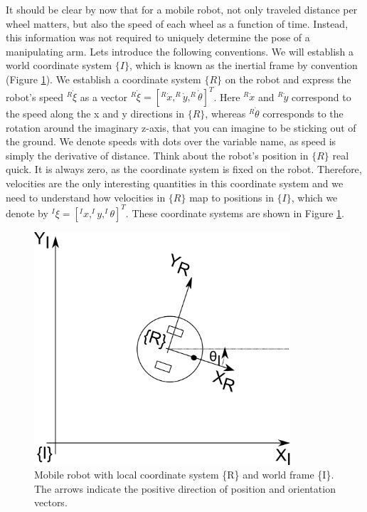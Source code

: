 It should be clear by now that for a mobile robot, not only traveled distance per wheel matters, but also the speed of each wheel as a function of time. Instead, this information was not required to uniquely determine the pose of a manipulating arm. Lets introduce the following conventions. We will establish a world coordinate system $\{I\}$, which is known as the inertial frame by convention (Figure \ref{fig:mobilerobot}). We establish a coordinate system $\{R\}$ on the robot and express the robot's speed $^R\dot{\xi}$ as a vector $ ^R\dot{\xi}=[^R\dot{x}, ^R\dot{y}, ^R\dot{\theta}]^T$. Here $^R\dot{x}$ and $^R\dot{y}$ correspond to the speed along the x and y directions in $\{R\}$, whereas $^R\dot{\theta}$ corresponds to the rotation around the imaginary z-axis, that you can imagine to be sticking out of the ground. We denote speeds with dots over the variable name, as speed is simply the derivative of distance.  Think about the robot's position in $\{R\}$ real quick. It is always zero, as the coordinate system is fixed on the robot. Therefore, velocities are the only interesting quantities in this coordinate system and we need to understand how velocities in $\{R\}$ map to positions in $ \{I\}$, which we denote by $^I\xi=[^Ix, ^Iy, ^I\theta]^T$. These coordinate systems are shown in Figure \ref{fig:mobilerobot}. 

\begin{figure}[htb!]
	\centering
		\includegraphics[width=0.85\textwidth]{figs/mobilerobot.png}
	\caption{Mobile robot with local coordinate system \{R\} and world frame \{I\}. The arrows indicate the positive direction of position and orientation vectors.}
	\label{fig:mobilerobot}
\end{figure}



